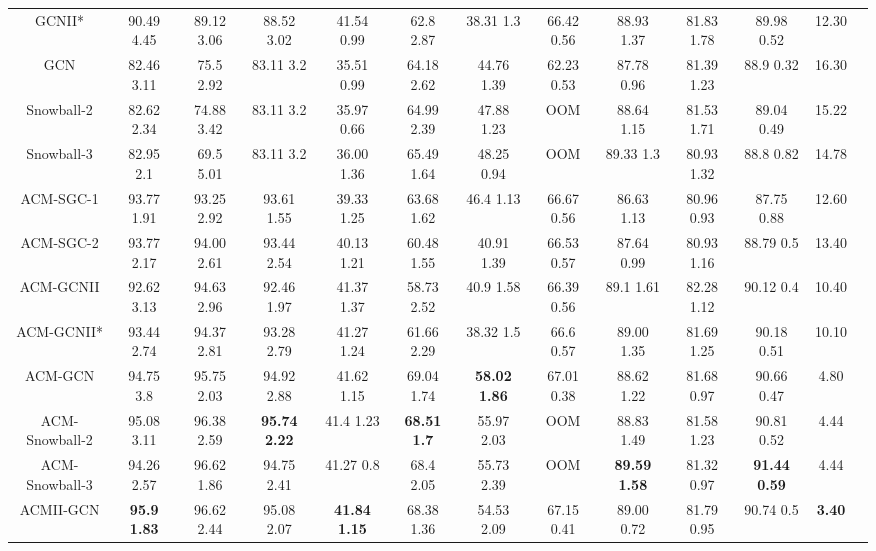 \documentclass{article}
\newcommand{\0}{{\boldsymbol{0}}}
\newcommand{\6}{{\partial}}
\newcommand{\8}{{\infty}}
\newcommand{\4}{{\nabla}}
\begin{document}
\begin{table}[htbp]
\begin{tabular}{c|cccccccccc|cc}
    GCNII* & 90.49  4.45 & 89.12  3.06 & 88.52  3.02 & 41.54  0.99 & 62.8  2.87 & 38.31  1.3 & 66.42  0.56 & 88.93  1.37 & 81.83  1.78 & 89.98  0.52 & 12.30 \\
    GCN   & 82.46  3.11 & 75.5  2.92 & 83.11  3.2 & 35.51  0.99 & 64.18  2.62 & 44.76  1.39 & 62.23  0.53 & 87.78  0.96 & 81.39  1.23 & 88.9  0.32 & 16.30 \\
    Snowball-2 & 82.62  2.34 & 74.88  3.42 & 83.11  3.2 & 35.97  0.66 & 64.99  2.39 & 47.88  1.23 & OOM   & 88.64  1.15 & 81.53  1.71 & 89.04  0.49 & 15.22 \\
    Snowball-3 & 82.95  2.1 & 69.5  5.01 & 83.11  3.2 & 36.00  1.36 & 65.49  1.64 & 48.25  0.94 & OOM   & 89.33  1.3 & 80.93  1.32 & 88.8  0.82 & 14.78 \\
    \midrule
    ACM-SGC-1 & 93.77  1.91 & 93.25  2.92 & 93.61  1.55 & 39.33  1.25 & 63.68  1.62 & 46.4  1.13 & 66.67  0.56 & 86.63  1.13 & 80.96  0.93 & 87.75  0.88 & 12.60 \\
    ACM-SGC-2 & 93.77  2.17 & 94.00  2.61 & 93.44  2.54 & 40.13  1.21 & 60.48  1.55 & 40.91  1.39 & 66.53  0.57 & 87.64  0.99 & 80.93  1.16 & 88.79  0.5 & 13.40 \\
    ACM-GCNII & 92.62  3.13 & 94.63  2.96 & 92.46  1.97 & 41.37  1.37 & 58.73  2.52 & 40.9  1.58 & 66.39  0.56 & 89.1  1.61 & 82.28  1.12 & 90.12  0.4 & 10.40 \\
    ACM-GCNII* & 93.44  2.74 & 94.37  2.81 & 93.28  2.79 & 41.27  1.24 & 61.66  2.29 & 38.32  1.5 & 66.6  0.57 & 89.00  1.35 & 81.69  1.25 & 90.18 0.51 & 10.10 \\
    ACM-GCN & 94.75  3.8 & 95.75  2.03 & 94.92  2.88 & 41.62  1.15 & 69.04  1.74 & \cellcolor[rgb]{ .816,  .808,  .808}\textbf{58.02  1.86} & 67.01  0.38 & 88.62  1.22 & 81.68  0.97 & 90.66  0.47 & 4.80 \\
    ACM-Snowball-2 & 95.08  3.11 & 96.38  2.59 & \cellcolor[rgb]{ .816,  .808,  .808}\textbf{95.74  2.22} & 41.4  1.23 & \cellcolor[rgb]{ .816,  .808,  .808}\textbf{68.51  1.7} & 55.97  2.03 & OOM   & 88.83  1.49 & 81.58  1.23 & 90.81  0.52 & 4.44 \\
    ACM-Snowball-3 & 94.26  2.57 & 96.62  1.86 & 94.75  2.41 & 41.27  0.8 & 68.4  2.05 & 55.73  2.39 & OOM   & \cellcolor[rgb]{ .816,  .808,  .808}\textbf{89.59  1.58} & 81.32  0.97 & \cellcolor[rgb]{ .816,  .808,  .808}\textbf{91.44  0.59} & 4.44 \\
    \midrule
    ACMII-GCN & \cellcolor[rgb]{ .816,  .808,  .808}\textbf{95.9  1.83} & 96.62  2.44 & 95.08  2.07 & \cellcolor[rgb]{ .816,  .808,  .808}\textbf{41.84  1.15} & 68.38  1.36 & 54.53  2.09 & 67.15  0.41 & 89.00  0.72 & 81.79  0.95 & 90.74  0.5 & \cellcolor[rgb]{ .816,  .808,  .808}\textbf{3.40} \\

\end{tabular}
\end{table}
\end{document}
